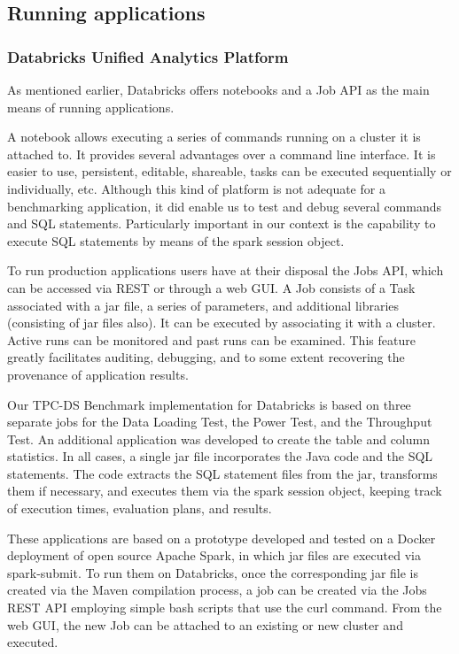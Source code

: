 \subsection{Running applications}
\subsubsection{Databricks Unified Analytics Platform}\label{runningApplicationsDatabricks}

As mentioned earlier, Databricks offers notebooks and a Job API as the main means of running applications.

A notebook allows executing a series of commands running on a cluster it is attached to. It provides several advantages over a command line interface. It is easier to use, persistent, editable, shareable, tasks can be executed sequentially or individually, etc. Although this kind of platform is not adequate for a benchmarking application, it did enable us to test and debug several commands and SQL statements. Particularly important in our context is the capability to execute SQL statements by means of the spark session object.

To run production applications users have at their disposal the Jobs API, which can be accessed via REST or through a web GUI. A Job consists of a Task associated with a jar file, a series of parameters, and additional libraries (consisting of jar files also). It can be executed by associating it with a cluster. Active runs can be monitored and past runs can be examined. This feature greatly facilitates auditing, debugging, and to some extent recovering the provenance of application results.

Our TPC-DS Benchmark implementation for Databricks is based on three separate jobs for the Data Loading Test, the Power Test, and the Throughput Test. An additional application was developed to create the table and column statistics. In all cases, a single jar file incorporates the Java code and the SQL statements. The code extracts the SQL statement files from the jar, transforms them if necessary, and executes them via the spark session object, keeping track of execution times, evaluation plans, and results.

These applications are based on a prototype developed and tested on a Docker deployment of open source Apache Spark, in which jar files are executed via spark-submit. To run them on Databricks, once the corresponding jar file is created via the Maven compilation process, a job can be created via the Jobs REST API employing simple bash scripts that use the curl command. From the web GUI, the new Job can be attached to an existing or new cluster and executed.

